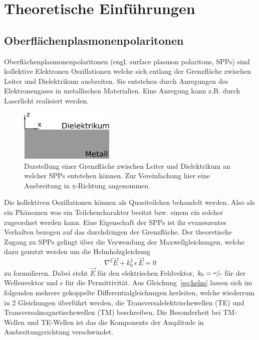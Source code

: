 \chapter{Theoretische Einführungen}

\section{Oberflächenplasmonenpolaritonen}%

Oberflächenplasmonenpolaritonen (engl. surface plasmon polaritons, SPPs)
sind kollektive Elektronen Oszillationen welche sich entlang der Grenzfläche
zwischen Leiter und Dielektrikum ausbreiten.\cite{plasmonics}
Sie entstehen durch Anregungen des Elektronengases in metallischen Materialien.
Eine Anregung kann z.B. durch Laserlicht realisiert werden. 

\begin{figure}
    \includegraphics[width=4.5cm]{./Plots/leiter_und_nichtleiter.pdf}
    \caption{Darstellung einer Grenzfläche zwischen Leiter und Dielektrikum an welcher 
    SPPs entstehen können. Zur Vereinfachung hier eine Ausbreitung in x-Richtung angenommen.\\}
    \label{fig:kasten}
\end{figure}
\FloatBarrier

Die kollektiven Oszillationen können als Quasiteilchen behandelt werden. 
Also als ein Phänomen was ein Teilchencharakter besitzt bzw. einem ein solcher zugeordnet werden kann. 
Eine Eigenschaft der SPPs ist ihr evaneszentes Verhalten bezogen auf das
durchdringen der Grenzfläche.
Der theoretische Zugang zu SPPs gelingt über die Verwendung der Maxwellgleichungen, welche dazu
genutzt werden um die Helmholzgleichung 
\begin{equation}
    \nabla^2 \vec{E} + k^2_0 \, \epsilon \, \vec{E} = 0
    \label{eq:helm}
\end{equation}
zu formulieren. 
Dabei steht $\vec{E}$ für den elektrischen Feldvektor, $k_0 = \sfrac{\omega}{c}$ 
für der Wellenvektor und $\epsilon$ für die Permittivität.
Aus Gleichung~\ref{eq:helm} lassen sich im folgenden mehrere gekoppelte Differentialgleichungen
herleiten, welche wiederrum in 2 Gleichungen überführt werden, die Transversalelektrischewellen (TE) und 
Transversalmagnetischewellen (TM) beschreiben.
Die Besonderheit bei TM-Wellen und TE-Wellen ist das 
die Komponente der Amplitude in Ausbreitungsrichtung verschwindet.

